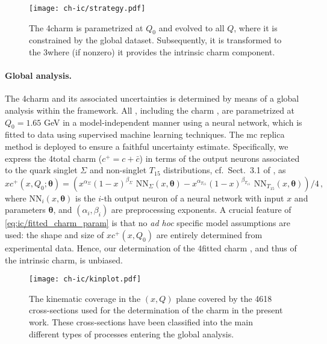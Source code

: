 \begin{figure}[h]
\begin{center}
  \texttt{[image: ch-ic/strategy.pdf]}
 \end{center}
\vspace{-0.2cm}
\caption{The 4\fns charm \pdf is parametrized  at $Q_0$
  and evolved to all  $Q$, where it is  constrained by the 
  global dataset. 
 Subsequently, it is transformed to the 3\fns where (if nonzero) it
 provides the intrinsic charm component.
  \label{fig:ic/strategy}
}
\end{figure}

\paragraph{Global \qcd analysis.}
%
The 4\fns charm \pdf and its associated uncertainties is determined by means of
a global \qcd analysis within the  framework.
%
All \pdfs, including the charm \pdf, are  parametrized at $Q_0=1.65$ GeV in 
a model-independent manner using a neural network, which is fitted to data
using  supervised machine learning techniques.
The \acrlong{mc} replica method is deployed to ensure a faithful uncertainty
estimate.
%
Specifically, we express the 4\fns total charm \pdf ($c^+=c+\bar{c}$)  in terms
of the output neurons associated to the quark singlet $\Sigma$ and non-singlet
$T_{15}$ distributions, cf.\ Sect.~3.1 of \cite{Ball:2021leu}, as
\begin{equation}
\label{eq:ic/fitted_charm_param}
xc^+(x,Q_0;{\boldsymbol \theta}) =
\left( x^{\alpha_{\Sigma}}(1-x)^{\beta_{\Sigma}} \textrm{ NN}_{\Sigma}(x,{\boldsymbol \theta})-
x^{\alpha_{T_{15}}}(1-x)^{\beta_{T_{15}}} \textrm{ NN}_{T_{15}}(x,{\boldsymbol \theta})
\right)/4 \, ,
\end{equation}
where $\textrm{NN}_{i}(x,{\boldsymbol \theta})$ is the $i$-th output neuron of
a neural network with input $x$ and  parameters ${\boldsymbol \theta}$, and 
$\left(\alpha_i,\beta_i\right)$ are preprocessing exponents.
%
A crucial feature of \cref{eq:ic/fitted_charm_param} is that no \textit{
ad hoc} specific model assumptions are used: the shape and size of
$xc^+(x,Q_0)$ are entirely determined from experimental data.
%
Hence, our determination of the 4\fns fitted charm \pdf, and thus of the intrinsic charm, is unbiased.
%

\begin{figure}[t]
\begin{center}
  \texttt{[image: ch-ic/kinplot.pdf]}
 \end{center}
\vspace{-0.8cm}
\caption{The kinematic coverage in the $(x,Q)$ plane
  covered by the 4618 cross-sections used for the
  determination of the charm \pdf in the present work.
  These cross-sections have been classified into the main different
  types of processes entering the global analysis.
  \label{fig:ic/kinplot}
}
\end{figure}

